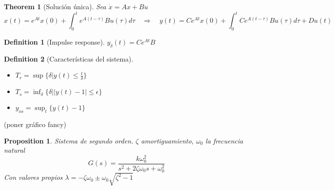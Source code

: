 \documentclass[leqno]{article}
\newtheorem*{theorem}{Theorem}
\newtheorem*{proposition}{Proposition}
\newtheorem*{definition}{Definition}
\begin{document}
\begin{theorem}[Solución única] Sea $\dot{x} = Ax + Bu$ 
  \[
 x(t) = e^{At}x(0) + \int_0^t e^{A(t-\tau )}Bu(\tau )d\tau \quad  \Rightarrow \quad
 y(t) = Ce^{At}x(0) + \int_0^t Ce^{A(t-\tau )}Bu(\tau )d\tau + Du(t)
  \] 
\end{theorem}

\begin{definition}[Impulse response] $y_\delta(t) = Ce^{At}B$

\end{definition}

\begin{definition}[Características del sistema]
  \begin{itemize}[topsep=-6pt, itemsep=0pt]
	\item $T_r = \sup \{\delta | y(t)\le \frac{t}{\delta}\}$ 
	\item $T_s=\inf_{\delta} \{\delta| |y(t)-1|\le \epsilon \}$ 
	\item $y_{os}= \sup_t\{y(t)-1\}$
  \end{itemize}
\end{definition}

(poner gráfico fancy)

\begin{proposition}
Sistema de segundo orden. $\zeta$ amortiguamiento, $\omega _0$ la frecuencia natural
\[
G(s)=\frac{k\omega _0^2}{s^2+2\zeta \omega _0 s + \omega _{0}^2}
\] 
Con valores propios $\lambda= -\zeta \omega _0 \pm \omega _0\sqrt{\zeta^2-1} $
\end{proposition}
\end{document}
